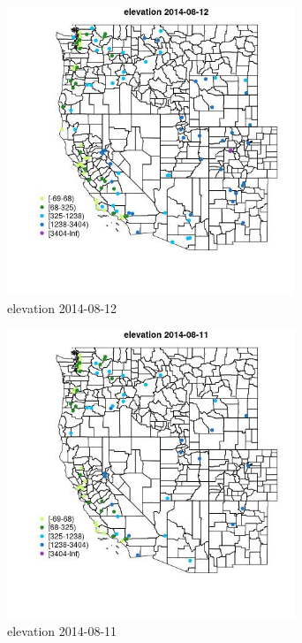\begin{figure} 
\centering  
\includegraphics[width=0.77\textwidth]{Code_Outputs/Report_ML_input_PM25_Step4_part_e_de_duplicated_aveswNAs_MapObselevation2014-08-12.jpg} 
\caption{\label{fig:Report_ML_input_PM25_Step4_part_e_de_duplicated_aveswNAsMapObselevation2014-08-12}elevation 2014-08-12} 
\end{figure} 
 

\clearpage 

\begin{figure} 
\centering  
\includegraphics[width=0.77\textwidth]{Code_Outputs/Report_ML_input_PM25_Step4_part_e_de_duplicated_aveswNAs_MapObselevation2014-08-11.jpg} 
\caption{\label{fig:Report_ML_input_PM25_Step4_part_e_de_duplicated_aveswNAsMapObselevation2014-08-11}elevation 2014-08-11} 
\end{figure} 
 

